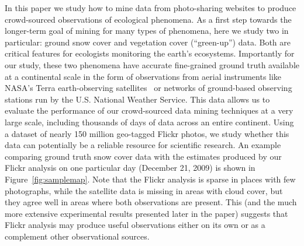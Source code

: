 \documentclass[10pt,journal,compsoc]{IEEEtran}
\begin{document}
  In this paper we study how to mine data from
photo-sharing websites to produce crowd-sourced observations of
ecological phenomena.  As a first step towards the longer-term goal of
mining for many types of phenomena, here we study two in particular:
ground snow cover and vegetation cover (``green-up'') data. Both are
critical features for ecologists monitoring the earth's ecosystems.
Importantly for our study, these two phenomena have accurate
fine-grained ground truth available at a continental scale in the form
of observations from aerial instruments like NASA's Terra earth-observing
satellites~\cite{modisveg,modissnow} or networks of ground-based
observing stations run by the U.S. National Weather Service. This
data allows us to evaluate the performance of our crowd-sourced data mining
techniques at a very large scale, including thousands of days of data
across an entire continent.
 Using a dataset of nearly 150 million geo-tagged Flickr photos, we
 study whether this data can potentially be a
 reliable resource for scientific research.  An example comparing
 ground truth snow cover data with the estimates produced by our
 Flickr analysis on one particular day (December 21, 2009) is shown in
 Figure~\ref{fig:samplemap}. Note that the Flickr analysis is sparse
 in places with few photographs, while the satellite data is missing
 in areas with cloud cover, but they agree well in areas where both
 observations are present. This (and the much more extensive experimental results presented later in the paper) suggests that Flickr analysis may produce
 useful observations either on its own or as a complement other
 observational sources.


\end{document}

